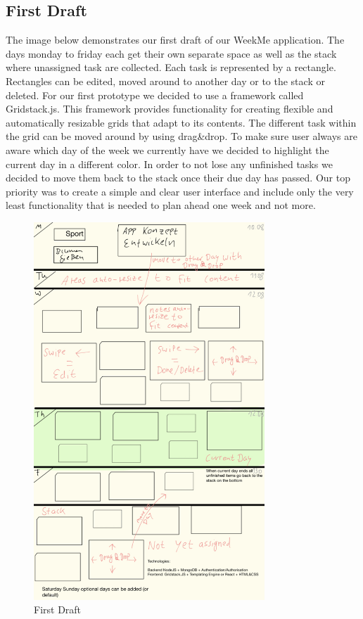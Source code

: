 \cleardoublepage 

\subsection{First Draft}  
	
The image below demonstrates our first draft of our WeekMe application. The days monday to friday each get their own separate space as well as the stack where unassigned task are collected. Each task is represented by a rectangle. Rectangles can be edited, moved around to another day or to the stack or deleted. For our first prototype we decided to use a framework called Gridstack.js. This framework provides functionality for creating flexible and automatically resizable grids that adapt to its contents. The different task within the grid can be moved around by using drag\&drop. To make sure user always are aware which day of the week we currently have we decided to highlight the current day in a different color. In order to not lose any unfinished tasks we decided to move them back to the stack once their due day has passed. Our top priority was to create a simple and clear user interface and include only the very least functionality that is needed to plan ahead one week and not more.   
 
 	\begin{figure}[H] 
		\centering 
		\includegraphics[height=14.2cm]{figures/firstdraft}    
		\caption{First Draft}     
	\end{figure}  







